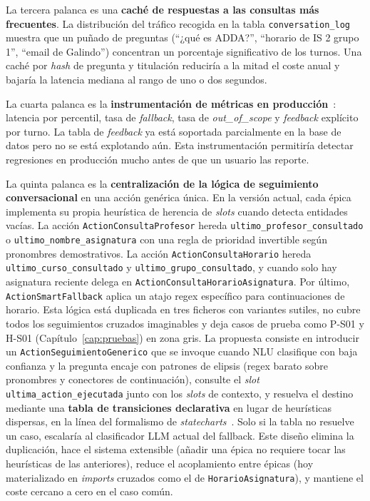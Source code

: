 La tercera palanca es una \textbf{caché de respuestas a las consultas más frecuentes}. La distribución del tráfico recogida en la tabla \texttt{conversation\_log} muestra que un puñado de preguntas (``¿qué es ADDA?'', ``horario de IS 2 grupo 1'', ``email de Galindo'') concentran un porcentaje significativo de los turnos. Una caché por \textit{hash} de pregunta y titulación reduciría a la mitad el coste anual y bajaría la latencia mediana al rango de uno o dos segundos.

La cuarta palanca es la \textbf{instrumentación de métricas en producción}~\cite{humble2010continuous}: latencia por percentil, tasa de \textit{fallback}, tasa de \textit{out\_of\_scope} y \textit{feedback} explícito por turno. La tabla de \textit{feedback} ya está soportada parcialmente en la base de datos pero no se está explotando aún. Esta instrumentación permitiría detectar regresiones en producción mucho antes de que un usuario las reporte.

La quinta palanca es la \textbf{centralización de la lógica de seguimiento conversacional} en una acción genérica única. En la versión actual, cada épica implementa su propia heurística de herencia de \textit{slots} cuando detecta entidades vacías. La acción \texttt{ActionConsultaProfesor} hereda \texttt{ultimo\_profesor\_consultado} o \texttt{ultimo\_nombre\_asignatura} con una regla de prioridad invertible según pronombres demostrativos. La acción \texttt{ActionConsultaHorario} hereda \texttt{ultimo\_curso\_consultado} y \texttt{ultimo\_grupo\_consultado}, y cuando solo hay asignatura reciente delega en \texttt{ActionConsultaHorarioAsignatura}. Por último, \texttt{ActionSmartFallback} aplica un atajo regex específico para continuaciones de horario. Esta lógica está duplicada en tres ficheros con variantes sutiles, no cubre todos los seguimientos cruzados imaginables y deja casos de prueba como P-S01 y H-S01 (Capítulo~\ref{cap:pruebas}) en zona gris. La propuesta consiste en introducir un \texttt{ActionSeguimientoGenerico} que se invoque cuando NLU clasifique con baja confianza y la pregunta encaje con patrones de elipsis (regex barato sobre pronombres y conectores de continuación), consulte el \textit{slot} \texttt{ultima\_action\_ejecutada} junto con los \textit{slots} de contexto, y resuelva el destino mediante una \textbf{tabla de transiciones declarativa} en lugar de heurísticas dispersas, en la línea del formalismo de \textit{statecharts}~\cite{harel1987statecharts}. Solo si la tabla no resuelve un caso, escalaría al clasificador LLM actual del fallback. Este diseño elimina la duplicación, hace el sistema extensible (añadir una épica no requiere tocar las heurísticas de las anteriores), reduce el acoplamiento entre épicas (hoy materializado en \textit{imports} cruzados como el de \texttt{HorarioAsignatura}), y mantiene el coste cercano a cero en el caso común.

